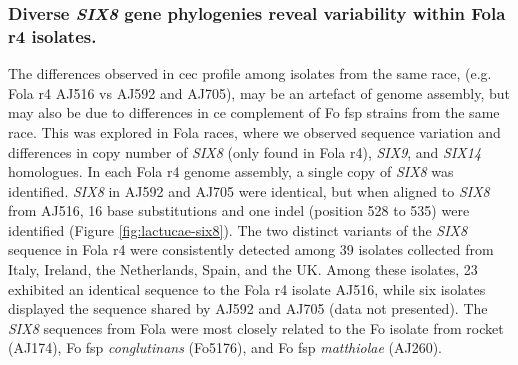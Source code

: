\subsubsection{Diverse \textit{SIX8} gene phylogenies reveal variability within \acl{Fola} \acl{r4} isolates.}

The differences observed in \ac{cec} profile among isolates from the same race, (e.g. \ac{Fola} \ac{r4} AJ516 vs AJ592 and AJ705), may be an artefact of genome assembly, but may also be due to differences in \ac{ce} complement of \ac{Fo} \ac{fsp} strains from the same race. This was explored in  \ac{Fola} races, where we observed sequence variation and differences in copy number of \textit{SIX8} (only found in \ac{Fola} \ac{r4}), \textit{SIX9}, and \textit{SIX14} homologues. In each \ac{Fola} \ac{r4} genome assembly, a single copy of \textit{SIX8} was identified. \textit{SIX8} in AJ592 and AJ705 were identical, but when aligned to \textit{SIX8} from AJ516, 16 base substitutions and one indel (position 528 to 535) were identified (Figure \ref{fig:lactucae-six8}). The two distinct variants of the \textit{SIX8} sequence in \ac{Fola} \ac{r4} were consistently detected among 39 isolates collected from Italy, Ireland, the Netherlands, Spain, and the UK. Among these isolates, 23 exhibited an identical sequence to the \ac{Fola} \ac{r4} isolate AJ516, while six isolates displayed the sequence shared by AJ592 and AJ705 (data not presented). The \textit{SIX8} sequences from \ac{Fola} were  most closely related to the \ac{Fo} isolate from rocket (AJ174), \ac{Fo} \ac{fsp} \textit{conglutinans} (Fo5176), and \ac{Fo} \ac{fsp} \textit{matthiolae} (AJ260).

